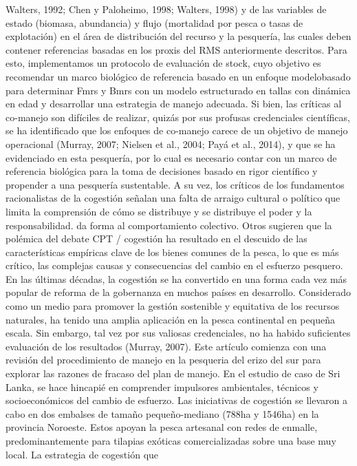 \documentclass[
]{article}
\begin{document}
Walters, 1992; Chen y Paloheimo, 1998; Walters, 1998) y de las variables
de estado (biomasa, abundancia) y flujo (mortalidad por pesca o tasas de
explotación) en el área de distribución del recurso y la pesquería, las
cuales deben contener referencias basadas en los proxis del RMS
anteriormente descritos. Para esto, implementamos un protocolo de
evaluación de stock, cuyo objetivo es recomendar un marco biológico de
referencia basado en un enfoque modelobasado para determinar Fmrs y Bmrs
con un modelo estructurado en tallas con dinámica en edad y desarrollar
una estrategia de manejo adecuada. Si bien, las críticas al co-manejo
son difíciles de realizar, quizás por sus profusas credenciales
científicas, se ha identificado que los enfoques de co-manejo carece de
un objetivo de manejo operacional (Murray, 2007; Nielsen et al., 2004;
Payá et al., 2014), y que se ha evidenciado en esta pesquería, por lo
cual es necesario contar con un marco de referencia biológica para la
toma de decisiones basado en rigor científico y propender a una
pesquería sustentable. A su vez, los críticos de los fundamentos
racionalistas de la cogestión señalan una falta de arraigo cultural o
político que limita la comprensión de cómo se distribuye y se distribuye
el poder y la responsabilidad. da forma al comportamiento colectivo.
Otros sugieren que la polémica del debate CPT / cogestión ha resultado
en el descuido de las características empíricas clave de los bienes
comunes de la pesca, lo que es más crítico, las complejas causas y
consecuencias del cambio en el esfuerzo pesquero. En las últimas
décadas, la cogestión se ha convertido en una forma cada vez más popular
de reforma de la gobernanza en muchos países en desarrollo. Considerado
como un medio para promover la gestión sostenible y equitativa de los
recursos naturales, ha tenido una amplia aplicación en la pesca
continental en pequeña escala. Sin embargo, tal vez por sus valiosas
credenciales, no ha habido suficientes evaluación de los resultados
(Murray, 2007). Este artículo comienza con una revisión del
procedimiento de manejo en la pesqueria del erizo del sur para explorar
las razones de fracaso del plan de manejo. En el estudio de caso de Sri
Lanka, se hace hincapié en comprender impulsores ambientales, técnicos y
socioeconómicos del cambio de esfuerzo. Las iniciativas de cogestión se
llevaron a cabo en dos embalses de tamaño pequeño-mediano (788ha y
1546ha) en la provincia Noroeste. Estos apoyan la pesca artesanal con
redes de enmalle, predominantemente para tilapias exóticas
comercializadas sobre una base muy local. La estrategia de cogestión que
\end{document}

